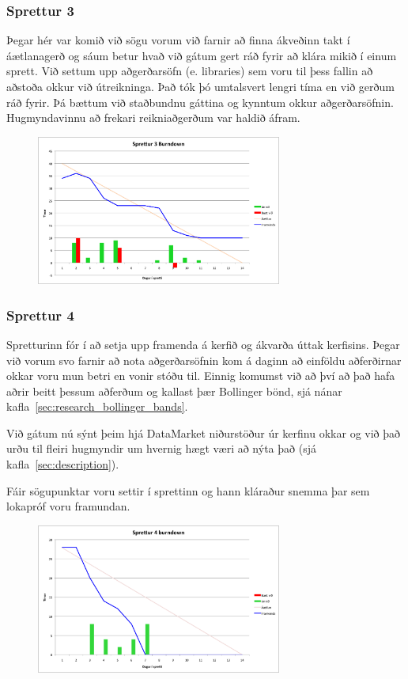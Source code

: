 \documentclass{article}
\begin{document}
\subsubsection{Sprettur 3}
Þegar hér var komið við sögu vorum við farnir að finna ákveðinn takt í
áætlanagerð og sáum betur hvað við gátum gert ráð fyrir að klára mikið 
í einum sprett. Við settum upp aðgerðarsöfn (e. libraries) sem voru til þess fallin að
aðstoða okkur við útreikninga. Það tók þó umtalsvert lengri tíma en við gerðum
ráð fyrir. Þá bættum við staðbundnu gáttina og kynntum okkur aðgerðarsöfnin.
Hugmyndavinnu að frekari reikniaðgerðum var haldið áfram.
\begin{figure}[H]
 \centering
 \includegraphics[width=0.72\textwidth]{Sprettur3_Burndown.png}
 \caption{}
\end{figure}
\subsubsection{Sprettur 4}
Spretturinn fór í að setja upp framenda á kerfið og ákvarða úttak kerfisins. 
Þegar við vorum svo farnir að nota aðgerðarsöfnin 
kom á daginn að einföldu aðferðirnar okkar voru mun betri en vonir stóðu til.
Einnig komumst við að því að það hafa aðrir beitt þessum aðferðum 
og kallast þær Bollinger bönd, sjá nánar kafla~\ref{sec:research_bollinger_bands}. 

Við gátum nú sýnt þeim hjá DataMarket niðurstöður úr kerfinu okkar og við það
urðu til fleiri hugmyndir um hvernig hægt væri að nýta það (sjá kafla~\ref{sec:description}).

Fáir sögupunktar voru settir í sprettinn og hann kláraður snemma þar sem lokapróf voru framundan.
\begin{figure}[H]
 \centering
 \includegraphics[width=0.72\textwidth]{Sprettur4_Burndown.png}
 \caption{}
\end{figure}
\end{document}
